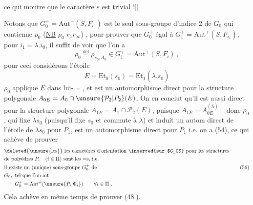 ce qui montre que \uline{le caractère $\varepsilon$ est trivial !}$]\!]$

 Notons que  $G_0^+=\mathrm{Aut}^+(S,F_{i_0})$ est le seul sous-groupe d'indice 2 de $G_0$ qui contienne $\rho_0$ (\uline{NB} $\dot\rho_0$  $\dot r_1\dot r_\infty$) , pour prouver que  $G_0^+$ égal à $G_1^+=\mathrm{Aut}^+(S,F_{i_1})$, pour $i_1=\lambda.i_0$, il suffit de voir que l'on a
\[
\rho_0\overset{\mathrm{déf}}{=}\rho_{s_0,A_0}\in G_1^+=\mathrm{Aut}^+(S,F_i)\,,
\tag*{(55)}
\]
pour ceci considérons l'étoile
\[
E=\mathrm{Et}_0(s_0)=\mathrm{Et}_1(\dot\lambda.s_0)
\]
$\rho_0$ applique $E$ dans lui-$=$, et est un automorphisme direct  pour la structure polygonale $A_{0E}=A_0\cap\unsure{\mathcal P_2|P_2}(E)$,  On en conclut qu'il est aussi direct pour la structure polygonale $A_{1E}=A_1\cap\mathcal P_2(E)$, puisque $A_{1E}=A_{0E}^{(\dot\lambda)}$ -- donc
$\rho_0$, qui fixe $\lambda s_0$ (puisqu'il fixe $s_0$ et commute à $\lambda$) et induit un autom direct de l'étoile de $\lambda s_0$  pour $P_1$, est un automorphisme direct pour $P_1$ i.e. on a (54), ce qui achève de prouver
\[
\begin{aligned}
&\text{\deleted{\unsure{les}} les caractères d'orientation \inserted{sur $G_0$} pour les structures}\\
&\text{de polyèdres }P_i\quad(i\in\Pi)\text{ sont les $=$s, i.e.}\\
&\text{il existe un (unique) sous-groupe }G_0^+\text{ de}\\
&G_0,\text{ tel que l'on ait}\\
&\qquad G_0^+=\mathrm{Aut}^+(\unsure{P_i|\Phi_i})\qquad\forall i\in\Pi\ .
\end{aligned}
\tag*{(56)}
\]
Cela achève en même temps de prouver (48.).

